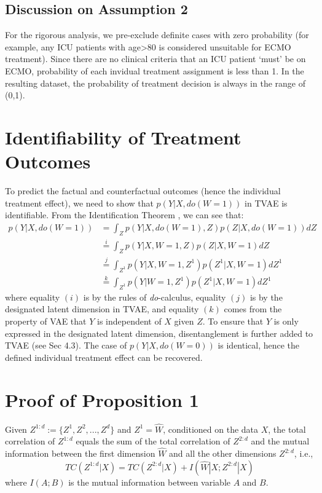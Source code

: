 \subsection{Discussion on Assumption 2}
For the rigorous analysis, we pre-exclude definite cases with zero probability (for example, any ICU patients with age>80 is considered unsuitable for ECMO treatment). Since there are no clinical criteria that an ICU patient ‘must’ be on ECMO, probability of each invidual treatment assignment is less than 1. In the resulting dataset, the probability of treatment decision is always in the range of (0,1). 

\section{Identifiability of Treatment Outcomes}
To predict the factual and counterfactual outcomes (hence the individual treatment effect), we need to show that $p(Y|X,\textit{do}(W=1))$ in TVAE is identifiable. From the Identification Theorem \cite{louizos2017cevae}, we can see that: 
\begin{align*}
    p(Y|X,\textit{do}(W=1))&=\int_{Z} p(Y|X,\textit{do}(W=1),Z)p(Z|X,\textit{do}(W=1))dZ\\
    &\stackrel{i}{=}\int_{Z} p(Y|X,W=1,Z)p(Z|X,W=1)dZ\\
    &\stackrel{j}{=}\int_{Z^1} p(Y|X,W=1,Z^1)p(Z^1|X,W=1)dZ^1\\
    &\stackrel{k}{=}\int_{Z^1} p(Y|W=1,Z^1)p(Z^1|X,W=1)dZ^1
\end{align*}
where equality $(i)$ is by the rules of \textit{do}-calculus, equality $(j)$ is by the designated latent dimension in TVAE, and equality $(k)$ comes from the property of VAE that $Y$ is independent of $X$ given $Z$. To ensure that $Y$ is only expressed in the designated latent dimension, disentanglement is further added to TVAE (see Sec 4.3). The case of $p(Y|X,\textit{do}(W=0))$ is identical, hence the defined individual treatment effect can be recovered.  
\section{Proof of Proposition 1}
\begin{proposition*}
    Given $Z^{1:d}:=\{Z^1, Z^2, ..., Z^d\}$ and $Z^1 = \hat{W}$, conditioned on the data $X$, the total correlation of $Z^{1:d}$ equals the sum of the total correlation of $Z^{2:d}$ and the mutual information between the first dimension $\hat{W}$ and all the other dimensions $Z^{2:d}$, i.e., 
\begin{equation}
        TC(Z^{1:d}|X) = TC(Z^{2:d}|X) 
    + I(\hat{W}|X;Z^{2:d}|X)
\end{equation}
where $I(A;B)$ is the mutual information between variable $A$ and $B$.
\end{proposition*}

